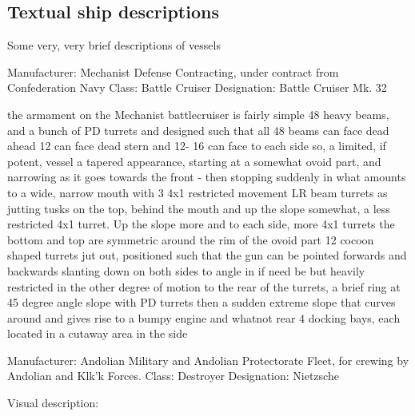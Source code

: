 \subsection{Textual ship descriptions}

Some very, very brief descriptions of vessels

Manufacturer: Mechanist Defense Contracting, under contract from Confederation Navy
Class: Battle Cruiser
Designation: Battle Cruiser Mk. 32

the armament on the Mechanist battlecruiser is fairly simple
48 heavy beams, and a bunch of PD turrets
and designed such that all 48 beams can face dead ahead
12 can face dead stern
and 12- 16 can face to each side
so, a limited, if potent, vessel
a tapered appearance, starting at a somewhat ovoid part, and narrowing as it goes towards the front - then stopping suddenly in what amounts to a wide, narrow mouth with 3 4x1 restricted movement LR beam turrets as jutting tusks
on the top, behind the mouth and up the slope somewhat, a less restricted 4x1 turret. Up the slope more and to each side, more 4x1 turrets
the bottom and top are symmetric
around the rim of the ovoid part
12 cocoon shaped turrets jut out, positioned such that the gun can be pointed forwards and backwards
slanting down on both sides to angle in if need be
but heavily restricted in the other degree of motion
to the rear of the turrets, a brief ring at 45 degree angle slope with PD turrets
then a sudden extreme slope that curves around and gives rise to a bumpy engine and whatnot rear
4 docking bays, each located in a cutaway area in the side


Manufacturer: Andolian Military and Andolian Protectorate Fleet, for crewing by Andolian and Klk'k Forces.
Class: Destroyer
Designation: Nietzsche

Visual description:

